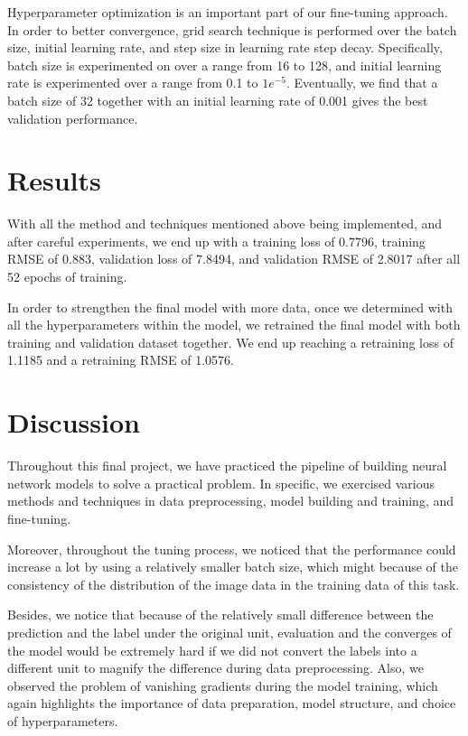 \documentclass[11pt]{article}
\begin{document}
Hyperparameter optimization is an important part of our fine-tuning
approach. In order to better convergence, grid search technique is
performed over the batch size, initial learning rate, and step size in
learning rate step decay. Specifically, batch size is experimented on
over a range from 16 to 128, and initial learning rate is experimented
over a range from 0.1 to \(1e^{-5}\). Eventually, we find that a batch
size of 32 together with an initial learning rate of 0.001 gives the
best validation performance.

    \hypertarget{results}{%
\section{Results}\label{results}}

With all the method and techniques mentioned above being implemented,
and after careful experiments, we end up with a training loss of 0.7796,
training RMSE of 0.883, validation loss of 7.8494, and validation RMSE
of 2.8017 after all 52 epochs of training.

In order to strengthen the final model with more data, once we
determined with all the hyperparameters within the model, we retrained
the final model with both training and validation dataset together. We
end up reaching a retraining loss of 1.1185 and a retraining RMSE of
1.0576.

    \hypertarget{discussion}{%
\section{Discussion}\label{discussion}}

Throughout this final project, we have practiced the pipeline of
building neural network models to solve a practical problem. In
specific, we exercised various methods and techniques in data
preprocessing, model building and training, and fine-tuning.

Moreover, throughout the tuning process, we noticed that the performance
could increase a lot by using a relatively smaller batch size, which
might because of the consistency of the distribution of the image data
in the training data of this task.

Besides, we notice that because of the relatively small difference
between the prediction and the label under the original unit, evaluation
and the converges of the model would be extremely hard if we did not
convert the labels into a different unit to magnify the difference
during data preprocessing. Also, we observed the problem of vanishing
gradients during the model training, which again highlights the
importance of data preparation, model structure, and choice of
hyperparameters.
\end{document}
